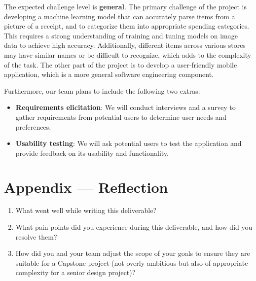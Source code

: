\documentclass{article}
\begin{document}
The expected challenge level is \textbf{general}. The primary challenge of the 
project is developing a machine learning model that can accurately parse
items from a picture of a receipt, and to categorize them into appropriate
spending categories. This requires a strong understanding of training
and tuning models on image data to achieve high accuracy. Additionally, different items across various stores may have similar names or be difficult to recognize, which adds to the complexity of the task. The other part of the project is to develop a user-friendly mobile application, which is a more general software engineering component.

Furthermore, our team plans to include the following two extras:
\begin{itemize}
    \item \textbf{Requirements elicitation}: We will conduct interviews and a survey to gather requirements from potential users to determine user needs and preferences.
    \item \textbf{Usability testing}: We will ask potential users to test the application and provide feedback on its usability and functionality.

\end{itemize}

\newpage{}

\section*{Appendix --- Reflection}



\begin{enumerate}
    \item What went well while writing this deliverable? 
    \item What pain points did you experience during this deliverable, and how
    did you resolve them?
    \item How did you and your team adjust the scope of your goals to ensure
    they are suitable for a Capstone project (not overly ambitious but also of
    appropriate complexity for a senior design project)?
\end{enumerate}  
\end{document}
